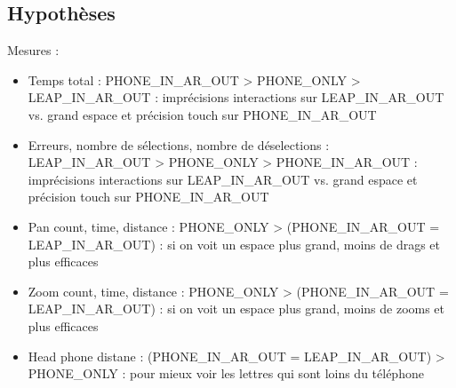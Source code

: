 \subsection{Hypothèses}
Mesures :
\begin{itemize}
  \item Temps total : PHONE_IN_AR_OUT > PHONE_ONLY > LEAP_IN_AR_OUT : imprécisions interactions sur LEAP_IN_AR_OUT vs. grand espace et précision touch sur PHONE_IN_AR_OUT
  \item Erreurs, nombre de sélections, nombre de déselections : LEAP_IN_AR_OUT > PHONE_ONLY > PHONE_IN_AR_OUT : imprécisions interactions sur LEAP_IN_AR_OUT vs. grand espace et précision touch sur PHONE_IN_AR_OUT
  \item Pan count, time, distance : PHONE_ONLY > (PHONE_IN_AR_OUT = LEAP_IN_AR_OUT) : si on voit un espace plus grand, moins de drags et plus efficaces
  \item Zoom count, time, distance : PHONE_ONLY > (PHONE_IN_AR_OUT = LEAP_IN_AR_OUT) : si on voit un espace plus grand, moins de zooms et plus efficaces
  \item Head phone distane : (PHONE_IN_AR_OUT = LEAP_IN_AR_OUT) > PHONE_ONLY : pour mieux voir les lettres qui sont loins du téléphone
\end{itemize}

